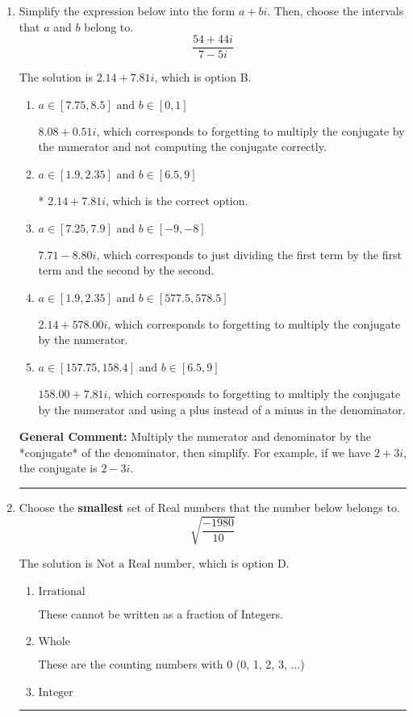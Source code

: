 \documentclass{extbook}[14pt]
\newcommand{\litem}[1]{\item #1

\rule{\textwidth}{0.4pt}}
\begin{document}
\begin{enumerate}\litem{
Simplify the expression below into the form $a+bi$. Then, choose the intervals that $a$ and $b$ belong to.
\[ \frac{54 + 44 i}{7 - 5 i} \]

The solution is \( 2.14  + 7.81 i \), which is option B.\begin{enumerate}[label=\Alph*.]
\item \( a \in [7.75, 8.5] \text{ and } b \in [0, 1] \)

 $8.08  + 0.51 i$, which corresponds to forgetting to multiply the conjugate by the numerator and not computing the conjugate correctly.
\item \( a \in [1.9, 2.35] \text{ and } b \in [6.5, 9] \)

* $2.14  + 7.81 i$, which is the correct option.
\item \( a \in [7.25, 7.9] \text{ and } b \in [-9, -8] \)

 $7.71  - 8.80 i$, which corresponds to just dividing the first term by the first term and the second by the second.
\item \( a \in [1.9, 2.35] \text{ and } b \in [577.5, 578.5] \)

 $2.14  + 578.00 i$, which corresponds to forgetting to multiply the conjugate by the numerator.
\item \( a \in [157.75, 158.4] \text{ and } b \in [6.5, 9] \)

 $158.00  + 7.81 i$, which corresponds to forgetting to multiply the conjugate by the numerator and using a plus instead of a minus in the denominator.
\end{enumerate}

\textbf{General Comment:} Multiply the numerator and denominator by the *conjugate* of the denominator, then simplify. For example, if we have $2+3i$, the conjugate is $2-3i$.
}
\litem{
Choose the \textbf{smallest} set of Real numbers that the number below belongs to.
\[ \sqrt{\frac{-1980}{10}} \]

The solution is \( \text{Not a Real number} \), which is option D.\begin{enumerate}[label=\Alph*.]
\item \( \text{Irrational} \)

These cannot be written as a fraction of Integers.
\item \( \text{Whole} \)

These are the counting numbers with 0 (0, 1, 2, 3, ...)
\item \( \text{Integer} \)


\end{enumerate}}
\end{enumerate}
\end{document}
